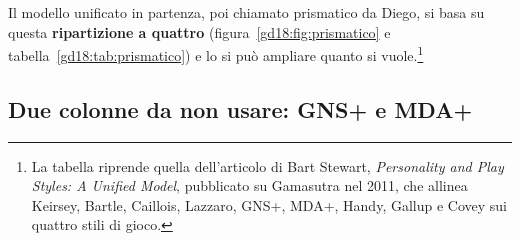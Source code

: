Il modello unificato in partenza, poi chiamato prismatico da Diego, si basa su
questa \textbf{ripartizione a quattro} (figura~\ref{gd18:fig:prismatico} e
tabella~\ref{gd18:tab:prismatico}) e lo si può ampliare quanto si vuole.\footnote{La
tabella riprende quella dell'articolo di Bart Stewart, \emph{Personality and Play
Styles: A Unified Model}, pubblicato su Gamasutra nel 2011, che allinea Keirsey,
Bartle, Caillois, Lazzaro, GNS+, MDA+, Handy, Gallup e Covey sui quattro stili di
gioco.}

\begin{table}[ht]
\centering
\scriptsize
\setlength{\tabcolsep}{3pt}
\caption{Il modello prismatico, senza le colonne GNS+ e MDA+ (che il docente chiede
di non usare). Motivazioni per esteso: \emph{power} (sensazione manipolativa),
\emph{security} (accumulo competitivo), \emph{knowledge} (scoperta logica delle
regole), \emph{identity} (relazioni emotive).}
\label{gd18:tab:prismatico}
\end{table}

\subsection{Due colonne da non usare: GNS+ e MDA+}


